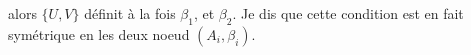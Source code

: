 
alors $\{U,V\}$ définit à la fois  $\beta_1$, et $\beta_2$.
Je dis que cette condition est en fait symétrique en les deux noeud $(A_i,\beta_i)$.


